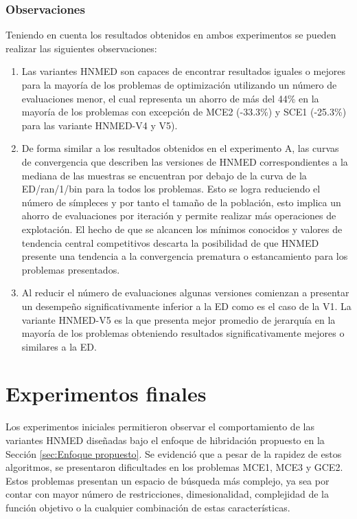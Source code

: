 \subsubsection{Observaciones}
Teniendo en cuenta los resultados obtenidos en ambos experimentos se pueden realizar las siguientes observaciones:
\begin{enumerate}
	\item Las variantes HNMED son capaces de encontrar resultados iguales o mejores para la mayoría de los problemas de optimización utilizando un número de evaluaciones menor, el cual representa un ahorro de más del 44\% en la mayoría de los problemas con excepción de MCE2 (-33.3\%) y SCE1 (-25.3\%) para las variante HNMED-V4 y V5).      
	\item De forma similar a los resultados obtenidos en el experimento A, las curvas de convergencia que describen las versiones de HNMED correspondientes a la mediana de las muestras se encuentran por debajo de la curva de la ED/ran/1/bin para la todos los problemas. Esto se logra reduciendo el número de símpleces y por tanto el tamaño de la población, esto implica un ahorro de evaluaciones por iteración y  permite realizar más operaciones de explotación. El hecho de que se alcancen los mínimos conocidos y valores de tendencia central competitivos descarta la posibilidad de que HNMED presente una tendencia a la convergencia prematura o estancamiento para los problemas presentados. 
	\item Al reducir el número de evaluaciones algunas versiones comienzan a presentar un desempeño significativamente inferior a la ED como es el caso de la V1. La variante HNMED-V5 es la que presenta mejor promedio de jerarquía en la mayoría de los problemas obteniendo resultados significativamente mejores o similares a la ED.
\end{enumerate}




\section{Experimentos finales}
Los experimentos iniciales permitieron observar el comportamiento de las variantes HNMED diseñadas bajo el enfoque de hibridación propuesto en la Sección \ref{sec:Enfoque propuesto}. Se evidenció que a pesar de la rapidez de estos algoritmos, se presentaron dificultades en los problemas MCE1, MCE3 y GCE2. Estos problemas presentan un espacio de búsqueda más complejo, ya sea por contar con mayor número de restricciones, dimesionalidad, complejidad de la función objetivo o la cualquier combinación de estas características. 


